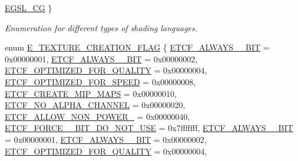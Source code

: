 \begin{DoxyCompactItemize}
\hyperlink{namespaceirr_1_1video_a913671e32f20f13e51336bfbe20a82a3a201c8a8056366df5a7f69f86ad599e01}{E\+G\+S\+L\+\_\+\+CG}
 \}\begin{DoxyCompactList}\small\item\em Enumeration for different types of shading languages. \end{DoxyCompactList}
\item 
enum \hyperlink{namespaceirr_1_1video_acaf6f7414534f7d62bff18c5bf11876f}{E\+\_\+\+T\+E\+X\+T\+U\+R\+E\+\_\+\+C\+R\+E\+A\+T\+I\+O\+N\+\_\+\+F\+L\+AG} \{ \newline
\hyperlink{namespaceirr_1_1video_acaf6f7414534f7d62bff18c5bf11876fabecb9e1d0b012d6393809a80e0041bf8}{E\+T\+C\+F\+\_\+\+A\+L\+W\+A\+Y\+S\+\_\+\_\+\+B\+IT} = 0x00000001, 
\hyperlink{namespaceirr_1_1video_acaf6f7414534f7d62bff18c5bf11876fadc16ca39b451f846d5611ac2b213620a}{E\+T\+C\+F\+\_\+\+A\+L\+W\+A\+Y\+S\+\_\+\_\+\+B\+IT} = 0x00000002, 
\hyperlink{namespaceirr_1_1video_acaf6f7414534f7d62bff18c5bf11876fa3d670628725ec4086237cbaf35b619d8}{E\+T\+C\+F\+\_\+\+O\+P\+T\+I\+M\+I\+Z\+E\+D\+\_\+\+F\+O\+R\+\_\+\+Q\+U\+A\+L\+I\+TY} = 0x00000004, 
\hyperlink{namespaceirr_1_1video_acaf6f7414534f7d62bff18c5bf11876faf43ab5c00fdf773dfeae1ed6380a662a}{E\+T\+C\+F\+\_\+\+O\+P\+T\+I\+M\+I\+Z\+E\+D\+\_\+\+F\+O\+R\+\_\+\+S\+P\+E\+ED} = 0x00000008, 
\newline
\hyperlink{namespaceirr_1_1video_acaf6f7414534f7d62bff18c5bf11876fa17c818cc743db8a0d9d991911812e4a0}{E\+T\+C\+F\+\_\+\+C\+R\+E\+A\+T\+E\+\_\+\+M\+I\+P\+\_\+\+M\+A\+PS} = 0x00000010, 
\hyperlink{namespaceirr_1_1video_acaf6f7414534f7d62bff18c5bf11876fa651fbb01805b4b9ec17f79eadfe11863}{E\+T\+C\+F\+\_\+\+N\+O\+\_\+\+A\+L\+P\+H\+A\+\_\+\+C\+H\+A\+N\+N\+EL} = 0x00000020, 
\hyperlink{namespaceirr_1_1video_acaf6f7414534f7d62bff18c5bf11876faa2ab03667e399d581bd0a612eec6c281}{E\+T\+C\+F\+\_\+\+A\+L\+L\+O\+W\+\_\+\+N\+O\+N\+\_\+\+P\+O\+W\+E\+R\+\_} = 0x00000040, 
\hyperlink{namespaceirr_1_1video_acaf6f7414534f7d62bff18c5bf11876fa38ea0c1f596277976d32ec70113443b0}{E\+T\+C\+F\+\_\+\+F\+O\+R\+C\+E\+\_\+\_\+\+B\+I\+T\+\_\+\+D\+O\+\_\+\+N\+O\+T\+\_\+\+U\+SE} = 0x7fffffff, 
\newline
\hyperlink{namespaceirr_1_1video_acaf6f7414534f7d62bff18c5bf11876fabecb9e1d0b012d6393809a80e0041bf8}{E\+T\+C\+F\+\_\+\+A\+L\+W\+A\+Y\+S\+\_\+\_\+\+B\+IT} = 0x00000001, 
\hyperlink{namespaceirr_1_1video_acaf6f7414534f7d62bff18c5bf11876fadc16ca39b451f846d5611ac2b213620a}{E\+T\+C\+F\+\_\+\+A\+L\+W\+A\+Y\+S\+\_\+\_\+\+B\+IT} = 0x00000002, 
\hyperlink{namespaceirr_1_1video_acaf6f7414534f7d62bff18c5bf11876fa3d670628725ec4086237cbaf35b619d8}{E\+T\+C\+F\+\_\+\+O\+P\+T\+I\+M\+I\+Z\+E\+D\+\_\+\+F\+O\+R\+\_\+\+Q\+U\+A\+L\+I\+TY} = 0x00000004, 

\end{DoxyCompactItemize}
